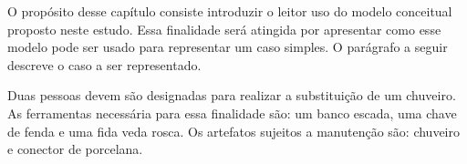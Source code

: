 O propósito desse capítulo consiste introduzir o leitor uso do modelo conceitual proposto neste estudo. Essa finalidade será atingida por apresentar como esse modelo pode ser usado para representar um caso simples. O parágrafo a seguir descreve o caso a ser representado. 

Duas pessoas devem são designadas para realizar a substituição de um chuveiro. As ferramentas necessária para essa  finalidade são: um banco escada, uma chave de fenda e uma fida veda rosca. Os artefatos sujeitos a manutenção são: chuveiro e conector de porcelana. 